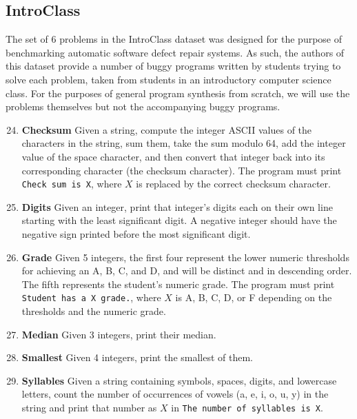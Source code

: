 \documentclass{sig-alternate}
\begin{document}
\subsection{IntroClass}


The set of 6 problems in the IntroClass dataset \cite{ManyBugsAndIntroClass, Brun13TRgptest} was designed for the purpose of benchmarking automatic software defect repair systems. As such, the authors of this dataset provide a number of buggy programs written by students trying to solve each problem, taken from students in an introductory computer science class. For the purposes of general program synthesis from scratch, we will use the problems themselves but not the accompanying buggy programs. 

\begin{enumerate}
\setcounter{enumi}{23}

\item
\textbf{Checksum}
Given a string, compute the integer ASCII values of the characters in the string, sum them, take the sum modulo 64, add the integer value of the space character, and then convert that integer back into its corresponding character (the checksum character). The program must print \texttt{Check sum is X}, where $X$ is replaced by the correct checksum character.

\item
\textbf{Digits}
Given an integer, print that integer's digits each on their own line starting with the least significant digit. A negative integer should have the negative sign printed before the most significant digit.

\item
\textbf{Grade}
Given 5 integers, the first four represent the lower numeric thresholds for achieving an A, B, C, and D, and will be distinct and in descending order. The fifth represents the student's numeric grade. The program must print \texttt{Student has a X grade.}, where $X$ is A, B, C, D, or F depending on the thresholds and the numeric grade.

\item
\textbf{Median}
Given 3 integers, print their median.

\item
\textbf{Smallest}
Given 4 integers, print the smallest of them.

\item
\textbf{Syllables}
Given a string containing symbols, spaces, digits, and lowercase letters, count the number of occurrences of vowels (a, e, i, o, u, y) in the string and print that number as $X$ in \texttt{The number of syllables is X}.

\end{enumerate}
\end{document}
